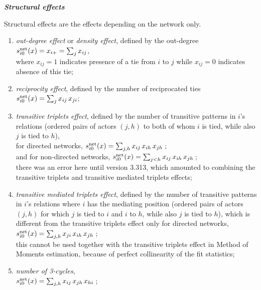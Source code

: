 \documentclass[a4paper,fleqn]{article}
\newcommand{\+}{\, + \,}
\newcommand{\vit}{\theenumi}
\begin{document}
{\noindent
\textbf{\emph{Structural effects}}
\medskip

\noindent
Structural effects are the effects depending on the network only.

\begin{enumerate}
 \item {\em out-degree effect} or \emph{density effect},
 \hypertarget{T_density}{defined by the out-degree} \\
 $s^{\rm net}_{i\vit}(x) = x_{i+} = \sum_j x_{ij}$,\\
 where $x_{ij}=1$ indicates presence of a tie from $i$ to $j$
 while $x_{ij}=0$ indicates absence of this tie;

 \item {\em reciprocity effect},
 \hypertarget{T_reci}{defined by the number of reciprocated ties}\\
 $s^{\rm net}_{i\vit}(x) = \sum_j x_{ij}\,x_{ji}$;

 \item {\em transitive triplets effect}, defined by the number of transitive
 patterns in $i$'s relations (ordered pairs of actors
 $(j,h)$ to both of whom $i$ is tied, while also $j$ is tied to $h$),\\
 for directed networks,
  $s^{\rm net}_{i\vit}(x) =  \sum_{j, h} x_{ij}\, x_{ih}\, x_{jh}\,$;\\
 and for non-directed networks,
 $s^{\rm net}_{i\vit}(x) =  \sum_{j < h} x_{ij}\, x_{ih}\, x_{jh}\,$;\\
 there was an error here until version 3.313,
 which amounted to combining the transitive triplets and transitive
 mediated triplets effects;

 \item {\em transitive mediated triplets effect}, defined by the number of transitive
 patterns in $i$'s relations where $i$ has the
 mediating position (ordered pairs of actors
 $(j,h)$ for which $j$ is tied to $i$ and $i$ to $h$, while also $j$ is tied to $h$),
 which is different from the transitive triplets effect only for directed networks,\\
  $s^{\rm net}_{i\vit}(x) =  \sum_{j, h} x_{ji}\, x_{ih}\, x_{jh}\,$;\\
 this cannot be used together with the transitive triplets effect in
 Method of Moments estimation, because of perfect collinearity
 of the fit statistics;

 \item {\em number of 3-cycles},\\
 $s^{\rm net}_{i\vit}(x) =  \sum_{j, h} x_{ij}\, x_{jh}\, x_{hi}\,$;



\end{enumerate}}
\end{document}
